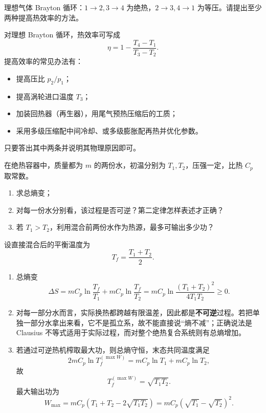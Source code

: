 \begin{question}
理想气体 Brayton 循环：$1\to2,3\to4$ 为绝热，$2\to3,4\to1$ 为等压。请提出至少两种提高热效率的方法。
\begin{solution}
对理想 Brayton 循环，热效率可写成
\[
\eta=1-\frac{T_4-T_1}{T_3-T_2}.
\]
提高效率的常见办法有：
\begin{itemize}[leftmargin=1.8em,itemsep=0.2em]
\item 提高压比 $p_2/p_1$；
\item 提高涡轮进口温度 $T_3$；
\item 加装回热器（再生器），用尾气预热压缩后的工质；
\item 采用多级压缩配中间冷却、或多级膨胀配再热并优化参数。
\end{itemize}
只要答出其中两条并说明其物理原因即可。
\end{solution}
\end{question}

\begin{question}
在绝热容器中，质量都为 $m$ 的两份水，初温分别为 $T_1,T_2$，压强一定，比热 $C_p$ 取常数。
\begin{enumerate}[label=（\arabic*）,leftmargin=2.8em,itemsep=0.2em]
\item 求总熵变；
\item 对每一份水分别看，该过程是否可逆？第二定律怎样表述才正确？
\item 若 $T_1>T_2$，利用混合前两份水作为热源，最多可输出多少功？
\end{enumerate}
\begin{solution}
设直接混合后的平衡温度为
\[
T_f=\frac{T_1+T_2}{2}.
\]
\begin{enumerate}[label=（\arabic*）,leftmargin=2.8em,itemsep=0.2em]
\item 总熵变
\[
\Delta S=mC_p\ln\frac{T_f}{T_1}+mC_p\ln\frac{T_f}{T_2}
=mC_p\ln\frac{(T_1+T_2)^2}{4T_1T_2}\ge 0.
\]
\item 对每一部分水而言，实际换热都跨越有限温差，因此都是\textbf{不可逆}过程。若把单独一部分水拿出来看，它不是孤立系，故不能直接说“熵不减”；正确说法是 Clausius 不等式适用于实际过程，而对整个绝热复合系统则有总熵增加。
\item 若通过可逆热机榨取最大功，则总熵守恒，末态共同温度满足
\[
2mC_p\ln T_f^{(\max W)}=mC_p\ln T_1+mC_p\ln T_2,
\]
故
\[
T_f^{(\max W)}=\sqrt{T_1T_2}.
\]
最大输出功为
\[
W_{\max}=mC_p(T_1+T_2-2\sqrt{T_1T_2})
=mC_p(\sqrt{T_1}-\sqrt{T_2})^2.
\]
\end{enumerate}
\end{solution}
\end{question}

